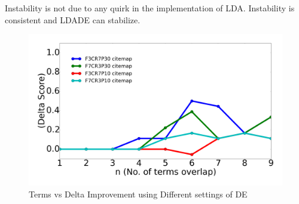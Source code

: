 \documentclass[twocolumn,5p,sort&compress]{elsarticle}
\theoremstyle{break}
\begin{document}
\begin{lesson}
  Instability is not due to any quirk in the implementation of LDA. Instability is consistent and LDADE can stabilize. 
\end{lesson}

\begin{figure}[!b]
  \includegraphics[width=\linewidth]{./fig/citemap.png}
  \caption{Terms vs Delta Improvement using Different settings of DE}
  \label{fig:RQ4}
\end{figure}
\end{document}
